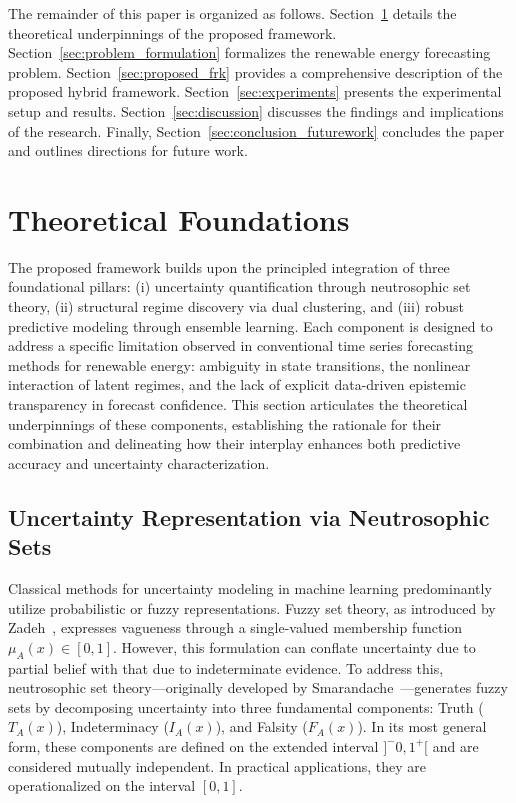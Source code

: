 \documentclass[review,3p,times]{elsarticle}
\begin{document}
The remainder of this paper is organized as follows. Section~\ref{sec:theoretical_foundations} details the theoretical underpinnings of the proposed framework. Section~\ref{sec:problem_formulation} formalizes the renewable energy forecasting problem. Section~\ref{sec:proposed_frk} provides a comprehensive description of the proposed hybrid framework. Section~\ref{sec:experiments} presents the experimental setup and results. Section~\ref{sec:discussion} discusses the findings and implications of the research. Finally, Section~\ref{sec:conclusion_futurework} concludes the paper and outlines directions for future work.


\section{Theoretical Foundations}
\label{sec:theoretical_foundations}

The proposed framework builds upon the principled integration of three foundational pillars: (i) uncertainty quantification through neutrosophic set theory, (ii) structural regime discovery via dual clustering, and (iii) robust predictive modeling through ensemble learning. Each component is designed to address a specific limitation observed in conventional time series forecasting methods for renewable energy: ambiguity in state transitions, the nonlinear interaction of latent regimes, and the lack of explicit data-driven epistemic transparency in forecast confidence. This section articulates the theoretical underpinnings of these components, establishing the rationale for their combination and delineating how their interplay enhances both predictive accuracy and uncertainty characterization.

\subsection{Uncertainty Representation via Neutrosophic Sets}

Classical methods for uncertainty modeling in machine learning predominantly utilize probabilistic or fuzzy representations. Fuzzy set theory, as introduced by Zadeh~\cite{zadeh1965fuzzy}, expresses vagueness through a single-valued membership function $\mu_A(x) \in [0,1]$. However, this formulation can conflate uncertainty due to partial belief with that due to indeterminate evidence. To address this, neutrosophic set theory—originally developed by Smarandache~\cite{smarandache1998neutrosophy}—generates fuzzy sets by decomposing uncertainty into three fundamental components: Truth ($T_A(x)$), Indeterminacy ($I_A(x)$), and Falsity ($F_A(x)$). In its most general form, these components are defined on the extended interval $]^{-}0, 1^{+}[$ and are considered mutually independent. In practical applications, they are operationalized on the interval $[0,1]$.
\end{document}
